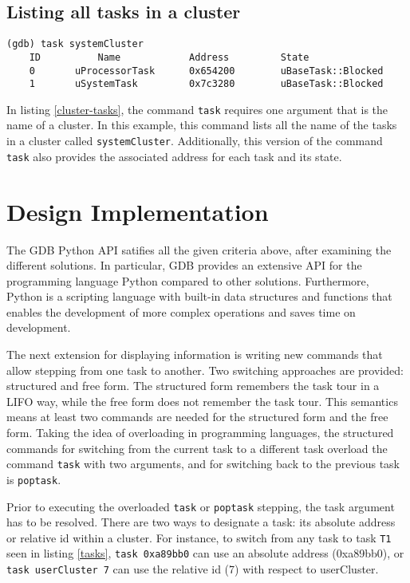 \subsection{Listing all tasks in a cluster}
\begin{lstlisting}[caption={\text{cluster\_tasks} command}, label={cluster-tasks}]
(gdb) task systemCluster
    ID          Name            Address         State
    0       uProcessorTask      0x654200        uBaseTask::Blocked
    1       uSystemTask         0x7c3280        uBaseTask::Blocked
\end{lstlisting}
In listing \ref{cluster-tasks}, the command \verb|task| requires one argument
that is the name of a cluster. In this example, this command lists
all the name of the tasks in a cluster called \verb|systemCluster|.
Additionally, this version of the command \verb|task| also provides the associated address
for each task and its state.

\section{Design Implementation}
The GDB Python API satifies all the given criteria above, after examining the different solutions. In particular, GDB provides an extensive API for
the programming language Python compared to other solutions. Furthermore, Python is a scripting language with built-in
data structures and functions that enables the development of more complex
operations and saves time on development.

The next extension for displaying information is writing new commands that allow
stepping from one \uCCS task to another. Two switching approaches are
provided: structured and free form. The structured form remembers the task tour in a
LIFO way, while the free form does not remember the task tour. This semantics means
at least two commands are needed for the structured form and the free form.
Taking the idea of overloading in programming languages, the structured
commands for switching from the current task to a different task overload the
command \verb|task| with two  arguments, and
for switching back to the previous task is \verb|poptask|.

Prior to executing the overloaded \verb|task| or \verb|poptask| stepping, the
task argument has to be resolved. There are two ways to designate a task: its
absolute address or relative id within a cluster. For instance, to switch from
any task to task \verb|T1| seen in listing \ref{tasks}, \verb|task 0xa89bb0| can use an absolute address (0xa89bb0), or \verb|task userCluster 7| can use the relative id (7) with respect to userCluster.

